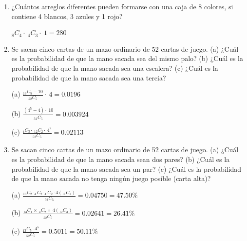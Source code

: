\documentclass[a4paper, 12pt]{article}
\newcommand{\Pspace}{0.5cm}
\newcommand{\Aspace}{0.2cm}
\begin{document}
\begin{enumerate}
    \vspace{\Aspace}
    (c) { \color{azul} $_{12}C_{2} = 66$ }
    
    \vspace{\Aspace}
    (d) { \color{azul} $_{20}C_{2} = 190$ }


    \vspace{\Pspace}
    \item ¿Cuántos arreglos diferentes pueden formarse con una caja de 8 colores, si contiene 4 blancos, 3 azules y 1 rojo?
    \vspace{\Aspace} \par
        { \color{azul} $_{8}C_{4} \cdot\ _{4}C_{3} \cdot\ 1 = 280$ }

    
    \newpage
    \vspace{\Pspace}
    \item Se sacan cinco cartas de un mazo ordinario de 52 cartas de juego. (a) ¿Cuál es la probabilidad de que la mano sacada sea del mismo palo? (b) ¿Cuál es la probabilidad de que la mano sacada sea una escalera? (c) ¿Cuál es la probabilidad de que la mano sacada sea una tercia?
    \vspace{\Aspace} \par
        (a) { \color{azul} $\frac{_{13}C_{5}-10}{_{52}C_{5}} \cdot\ 4 = 0{.}0196$ }
    
    \vspace{\Aspace}
    (b) { \color{azul} $\frac{(4^{5}-4) \cdot\ 10}{_{52}C_{5}} = 0{.}003924$ }
    
    \vspace{\Aspace}
    (c) { \color{azul} $\frac{_{4}C_{3} \cdot\ _{12}C_{2} \cdot\ 4^{2}}{_{52}C_{5}} = 0{.}02113$ }


    \vspace{\Pspace}
    \item Se sacan cinco cartas de un mazo ordinario de 52 cartas de juego. (a) ¿Cuál es la probabilidad de que la mano sacada sean dos pares? (b) ¿Cuál es la probabilidad de que la mano sacada sea un par? (c) ¿Cuál es la probabilidad de que la mano sacada no tenga ningún juego posible (carta alta)?
    \vspace{\Aspace} \par
    (a) { \color{azul} $\frac{_{13}C_{2} \cdot _{4}C_{2} \cdot _{4}C_{2} \cdot 4(_{11}C_{1})}{_{52}C_{5}} = 0{.}04750 = 47{.}50\%$
    }
    
    \vspace{\Aspace}
    (b) { \color{azul} $\frac{_{13}C_{1} \times\ _{4}C_{2} \times\ 4(_{12}C_{3})}{_{52}C_{5}} = 0{.}02641 = 26{.}41\%$
    }
    
    \vspace{\Aspace}
    (c) { \color{azul}  
        $\frac{_{13}C_{5} \cdot 4^{5}}{_{52}C_{5}} = 0{.}5011 = 50{.}11\%$
    } 
\end{enumerate}
\end{document}

